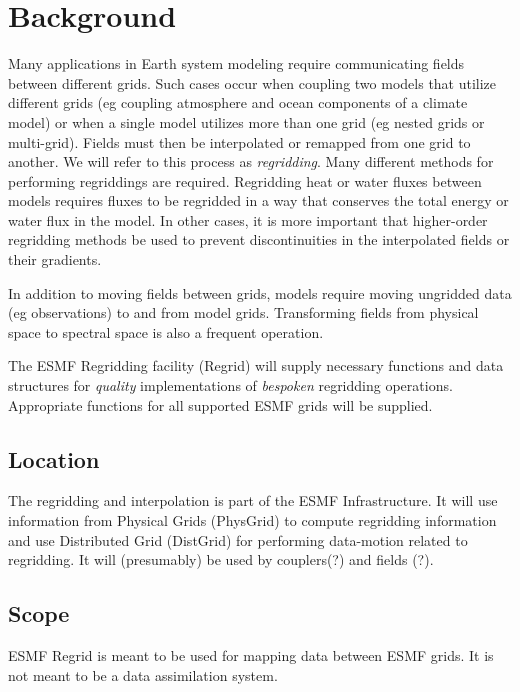 
\section{Background}

Many applications in Earth system modeling require
communicating fields between different grids.  Such
cases occur when coupling two models that utilize
different grids (eg coupling atmosphere and ocean
components of a climate model) or when a single model
utilizes more than one grid (eg nested grids or multi-grid).
Fields must then be interpolated or remapped
from one grid to another.  We will refer to this process
as {\em regridding}. Many different methods
for performing regriddings are required.
Regridding heat or water fluxes between models requires
fluxes to be regridded in a way that conserves
the total energy or water flux in the model.  In other
cases, it is more important that higher-order
regridding methods be used to prevent discontinuities
in the interpolated fields or their gradients.

In addition to moving fields between grids,
models require moving ungridded data (eg observations)
to and from model grids.  Transforming fields
from physical space to spectral space is also
a frequent operation.

The ESMF Regridding facility (Regrid) will
supply necessary functions and data structures for
{\em quality} implementations of {\em bespoken} regridding
operations.  Appropriate functions for all supported
ESMF grids will be supplied.

\subsection{Location}

The regridding and interpolation is part of the ESMF
Infrastructure.  It will use information from Physical
Grids (PhysGrid) to compute regridding information and
use Distributed Grid (DistGrid) for performing
data-motion related to regridding.  It will (presumably)
be used by couplers(?) and fields (?).

\subsection{Scope}

ESMF Regrid is meant to be used for mapping data
between ESMF grids.  It is not meant to be a data
assimilation system.

